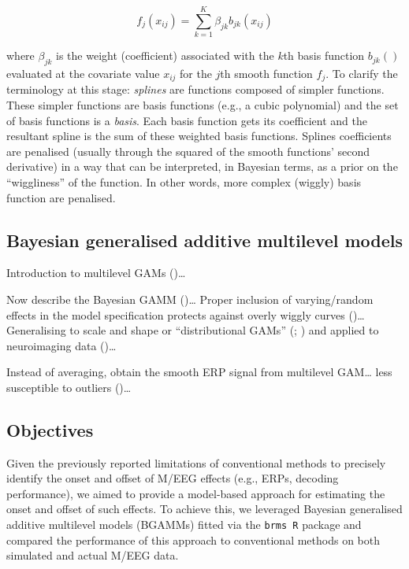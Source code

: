 \documentclass[
  doc,
  floatsintext,
  longtable,
  a4paper,
  nolmodern,
  notxfonts,
  notimes,
  colorlinks=true,linkcolor=blue,citecolor=blue,urlcolor=blue]{apa7}
\begin{document}
\[
f_{j}\left(x_{i j}\right) = \sum_{k=1}^K \beta_{jk} b_{jk}\left(x_{ij}\right)
\]

where \(\beta_{jk}\) is the weight (coefficient) associated with the
\(k\)th basis function \(b_{jk}()\) evaluated at the covariate value
\(x_{ij}\) for the \(j\)th smooth function \(f_{j}\). To clarify the
terminology at this stage: \emph{splines} are functions composed of
simpler functions. These simpler functions are basis functions (e.g., a
cubic polynomial) and the set of basis functions is a \emph{basis}. Each
basis function gets its coefficient and the resultant spline is the sum
of these weighted basis functions. Splines coefficients are penalised
(usually through the squared of the smooth functions' second derivative)
in a way that can be interpreted, in Bayesian terms, as a prior on the
``wiggliness'' of the function. In other words, more complex (wiggly)
basis function are penalised.

\subsection{Bayesian generalised additive multilevel
models}\label{bayesian-generalised-additive-multilevel-models}

Introduction to multilevel GAMs
()\ldots{}

Now describe the Bayesian GAMM ()\ldots{} Proper inclusion of varying/random effects in the model
specification protects against overly wiggly curves
()\ldots{} Generalising
to scale and shape or ``distributional GAMs''
(;
) and applied to
neuroimaging data ()\ldots{}

Instead of averaging, obtain the smooth ERP signal from multilevel
GAM\ldots{} less susceptible to outliers
()\ldots{}

\subsection{Objectives}\label{objectives}

Given the previously reported limitations of conventional methods to
precisely identify the onset and offset of M/EEG effects (e.g., ERPs,
decoding performance), we aimed to provide a model-based approach for
estimating the onset and offset of such effects. To achieve this, we
leveraged Bayesian generalised additive multilevel models (BGAMMs)
fitted via the \texttt{brms\ R} package and compared the performance of
this approach to conventional methods on both simulated and actual M/EEG
data.
\end{document}
